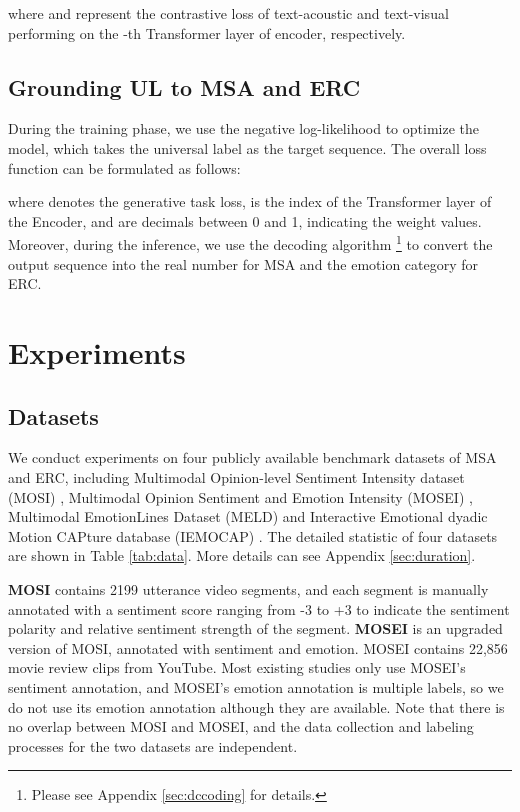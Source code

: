 \documentclass[11pt]{article}
\begin{document}
where  and  represent the contrastive loss of text-acoustic and text-visual performing on the -th Transformer layer of encoder, respectively.

\subsection{Grounding UL to MSA and ERC}
During the training phase, we use the negative log-likelihood to optimize the model, which takes the universal label as the target sequence. The overall loss function can be formulated as follows:

where  denotes the generative task loss,  is the index of the Transformer layer of the Encoder, and  are decimals between 0 and 1, indicating the weight values. Moreover, during the inference, we use the decoding algorithm \footnote{Please see Appendix \ref{sec:dccoding} for details.} to convert the output sequence into the real number for MSA and the emotion category for ERC.

\section{Experiments}
\subsection{Datasets}
We conduct experiments on four publicly available benchmark datasets of MSA and ERC, including Multimodal Opinion-level Sentiment Intensity dataset (MOSI) \cite{DBLP:journals/expert/ZadehZPM16}, Multimodal Opinion Sentiment and Emotion Intensity (MOSEI) \cite{DBLP:conf/acl/MorencyCPLZ18}, Multimodal EmotionLines Dataset (MELD) \cite{DBLP:conf/acl/PoriaHMNCM19} and Interactive Emotional dyadic Motion CAPture database (IEMOCAP) \cite{DBLP:journals/lre/BussoBLKMKCLN08}. The detailed statistic of four datasets are shown in Table \ref{tab:data}. More details can see Appendix \ref{sec:duration}.

\textbf{MOSI} contains 2199 utterance video segments, and each segment is manually annotated with a sentiment score ranging from -3 to +3 to indicate the sentiment polarity and relative sentiment strength of the segment. \textbf{MOSEI} is an upgraded version of MOSI, annotated with sentiment and emotion. MOSEI contains 22,856 movie review clips from YouTube. Most existing studies only use MOSEI’s sentiment annotation, and MOSEI’s emotion annotation is multiple labels, so we do not use 
its emotion annotation although they are available. Note that there is no overlap between MOSI and MOSEI, and the data collection and labeling processes for the two datasets are independent.
\end{document}

